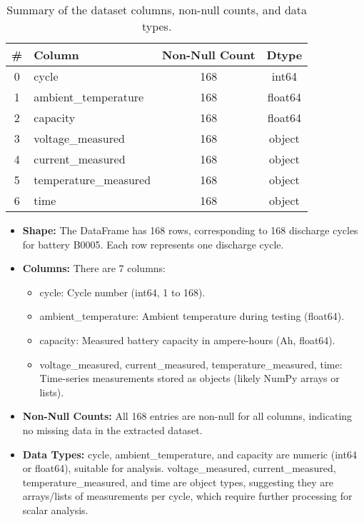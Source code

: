 \begin{table}[h!]
\centering
\begin{tabular}{@{}clcc@{}}
\toprule
\# & \textbf{Column} & \textbf{Non-Null Count} & \textbf{Dtype} \\ 
\midrule
0 & cycle                 & 168 & int64    \\
1 & ambient\_temperature   & 168 & float64  \\
2 & capacity              & 168 & float64  \\
3 & voltage\_measured      & 168 & object   \\
4 & current\_measured      & 168 & object   \\
5 & temperature\_measured  & 168 & object   \\
6 & time                  & 168 & object   \\
\bottomrule
\end{tabular}
\caption{Summary of the dataset columns, non-null counts, and data types.}
\label{tab:eda1}
\end{table}

\begin{itemize}
    \item \textbf{Shape:} The DataFrame has 168 rows, corresponding to 168 discharge cycles for battery B0005. Each row represents one discharge cycle.
    \item \textbf{Columns:} There are 7 columns: \begin{itemize}
        \item cycle: Cycle number (int64, 1 to 168).
        \item ambient\_temperature: Ambient temperature during testing (float64).
        \item capacity: Measured battery capacity in ampere-hours (Ah, float64).
        \item voltage\_measured, current\_measured, temperature\_measured, time: Time-series measurements stored as objects (likely NumPy arrays or lists).
    \end{itemize}
    \item \textbf{Non-Null Counts:} All 168 entries are non-null for all columns, indicating no missing data in the extracted dataset.
    \item \textbf{Data Types:} cycle, ambient\_temperature, and capacity are numeric (int64 or float64), suitable for analysis. voltage\_measured, current\_measured, temperature\_measured, and time are object types, suggesting they are arrays/lists of measurements per cycle, which require further processing for scalar analysis.
\end{itemize}

